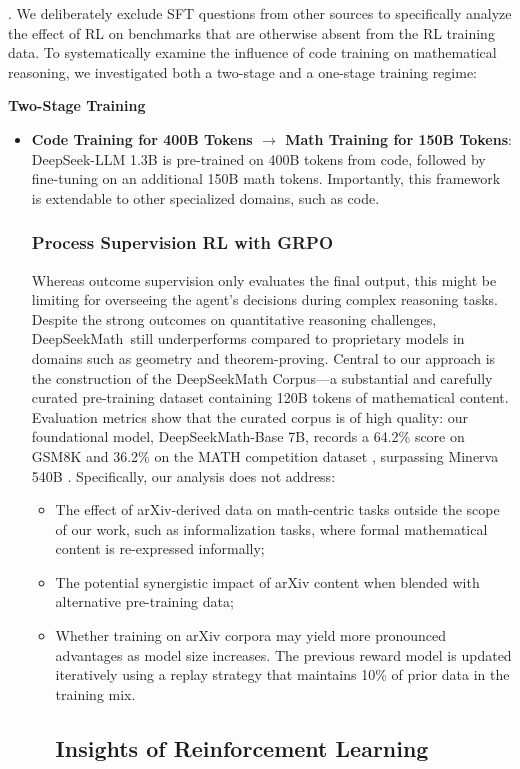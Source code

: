 \begin{algorithm}[t]
\begin{algorithmic}[1]
\citep{agieval}. We deliberately exclude SFT questions from other sources to specifically analyze the effect of RL on benchmarks that are otherwise absent from the RL training data. To systematically examine the influence of code training on mathematical reasoning, we investigated both a two-stage and a one-stage training regime:

\textbf{Two-Stage Training}

\begin{itemize}[topsep=0pt]
    \item \textbf{Code Training for 400B Tokens $\rightarrow$ Math Training for 150B Tokens}: DeepSeek-LLM 1.3B is pre-trained on 400B tokens from code, followed by fine-tuning on an additional 150B math tokens. Importantly, this framework is extendable to other specialized domains, such as code. \subsubsection{Process Supervision RL with GRPO} Whereas outcome supervision only evaluates the final output, this might be limiting for overseeing the agent's decisions during complex reasoning tasks. Despite the strong outcomes on quantitative reasoning challenges, DeepSeekMath~still underperforms compared to proprietary models in domains such as geometry and theorem-proving. Central to our approach is the construction of the DeepSeekMath Corpus—a substantial and carefully curated pre-training dataset containing 120B tokens of mathematical content. Evaluation metrics show that the curated corpus is of high quality: our foundational model, DeepSeekMath-Base 7B, records a 64.2\% score on GSM8K \citep{gsm8k} and 36.2\% on the MATH competition dataset \citep{MATH}, surpassing Minerva 540B \citep{minerva}. Specifically, our analysis does not address:

\begin{itemize}[topsep=0pt]
    \item The effect of arXiv-derived data on math-centric tasks outside the scope of our work, such as informalization tasks, where formal mathematical content is re-expressed informally;
    \item The potential synergistic impact of arXiv content when blended with alternative pre-training data;
    \item Whether training on arXiv corpora may yield more pronounced advantages as model size increases. The previous reward model is updated iteratively using a replay strategy that maintains 10\% of prior data in the training mix. \subsection{Insights of Reinforcement Learning}

\end{itemize}
\end{itemize}
\end{algorithmic}
\end{algorithm}

